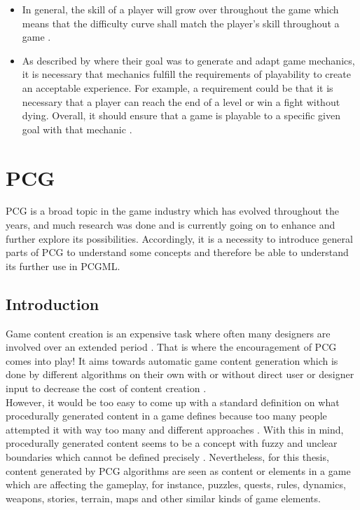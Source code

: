 \documentclass[MGS,Master,english]{twbook}%
\begin{document}
\begin{itemize}
	\item In general, the skill of a player will grow over throughout the game which means that the difficulty curve shall match the player's skill throughout a game \cite{mechanic::gamasutra::DanielDoan}. 
	\item As described by \cite{mechanic::generateAndAdaptingMechanics} where their goal was to generate and adapt game mechanics, it is necessary that mechanics fulfill the requirements of playability to create an acceptable experience. For example, a requirement could be that it is necessary that a player can reach the end of a level or win a fight without dying. Overall, it should ensure that a game is playable to a specific given goal with that mechanic \cite{mechanic::generateAndAdaptingMechanics}.
\end{itemize} 


%
%
\clearpage
\chapter{\acl{PCG}}
\ac{PCG} is a broad topic in the game industry which has evolved throughout the years, and much research was done and is currently going on to enhance and further explore its possibilities. Accordingly, it is a necessity to introduce general parts of PCG to understand some concepts and therefore be able to understand its further use in PCGML.

\section{Introduction}
Game content creation is an expensive task where often many designers are involved over an extended period \cite{pcg::PCGinGameIndustry}. That is where the encouragement of \ac{PCG} comes into play! It aims towards automatic game content generation which is done by different algorithms on their own with or without direct user or designer input to decrease the cost of content creation \cite{pcg::PCGinGameIndustry} \cite{pcg::whatIsPCG}.\\
However, it would be too easy to come up with a standard definition on what procedurally generated content in a game defines because too many people attempted it with way too many and different approaches \cite{pcg::whatIsPCG}. With this in mind, procedurally generated content seems to be a concept with fuzzy and unclear boundaries which cannot be defined precisely \cite{pcg::whatIsPCG}. Nevertheless, for this thesis, content generated by PCG algorithms are seen as content or elements in a game which are affecting the gameplay, for instance, puzzles, quests, rules, dynamics, weapons, stories, terrain, maps and other similar kinds of game elements.
\end{document}
